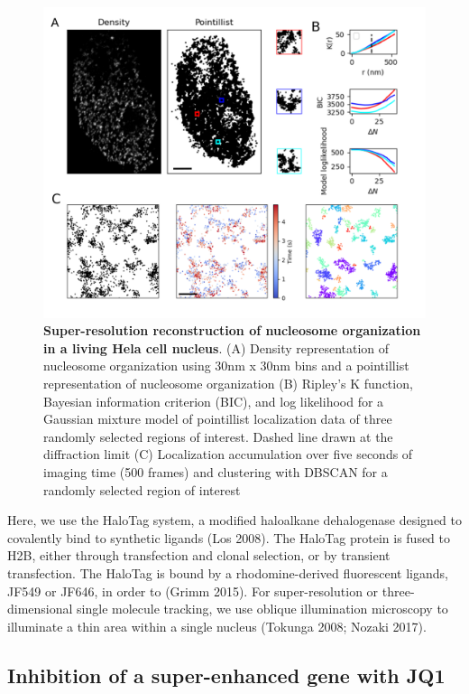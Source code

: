 \documentclass{ucetd}
\begin{document}
\begin{figure}
\begin{center}
\includegraphics[width=16cm]{ClusterFull.png}
\end{center}
\caption{\textbf{Super-resolution reconstruction of nucleosome organization in a living Hela cell nucleus}. (A) Density representation of nucleosome organization using 30nm x 30nm bins and a pointillist representation of nucleosome organization (B) Ripley's K function, Bayesian information criterion (BIC), and log likelihood for a Gaussian mixture model of pointillist localization data of three randomly selected regions of interest. Dashed line drawn at the diffraction limit (C) Localization accumulation over five seconds of imaging time (500 frames) and clustering with DBSCAN for a randomly selected region of interest}
\end{figure}

Here, we use the HaloTag system, a modified haloalkane dehalogenase designed to covalently bind to synthetic ligands  (Los 2008). The HaloTag protein is fused to H2B, either through transfection and clonal selection, or by transient transfection. The HaloTag is bound by a rhodomine-derived fluorescent ligands, JF549 or JF646, in order to (Grimm 2015). For super-resolution or three-dimensional single molecule tracking, we use oblique illumination microscopy to illuminate a thin area within a single nucleus (Tokunga 2008; Nozaki 2017). 

\subsection{Inhibition of a super-enhanced gene with JQ1}
\end{document}
